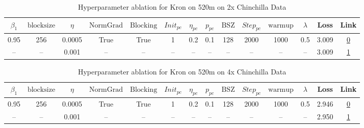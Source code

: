 \begin{table}[H]
\centering
\caption{Hyperparameter ablation for Kron on 520m on 2x Chinchilla Data}
\label{tab:ablation_kron_520m_2}
\begin{tabular}{cccccccccccccc}
\toprule
$\beta_1$ & $\mathrm{block size}$ & $\eta$ & $\mathrm{NormGrad}$ & $\mathrm{Blocking}$ & $Init_{pc}$ & $\eta_{pc}$ & $p_{pc}$ & $\mathrm{BSZ}$ & $Step_{pc}$ & $\mathrm{warmup}$ & $\lambda$ & Loss & Link \\
\midrule
0.95 & 256 & 0.0005 & True & True & 1 & 0.2 & 0.1 & 128 & 2000 & 1000 & 0.5 & 3.009 & \href{https://wandb.ai/stanford-mercury/optimizer-scaling/runs/sweep-520m-21B-krona6b124lr0.0005-wd0.5-b10.95-plr0.2-pis1-gn1-n-6acf07}{0} \\
\midrule
-- & -- & 0.001 & -- & -- & -- & -- & -- & -- & -- & -- & -- & 3.009 & \href{https://wandb.ai/stanford-mercury/optimizer-scaling/runs/sweep-520m-21B-kron680ae4lr0.001-wd0.5-b10.95-plr0.2-pis1-gn1-no-405d3d}{1} \\
\bottomrule
\end{tabular}
\end{table}

\begin{table}[H]
\centering
\caption{Hyperparameter ablation for Kron on 520m on 4x Chinchilla Data}
\label{tab:ablation_kron_520m_4}
\begin{tabular}{cccccccccccccc}
\toprule
$\beta_1$ & $\mathrm{block size}$ & $\eta$ & $\mathrm{NormGrad}$ & $\mathrm{Blocking}$ & $Init_{pc}$ & $\eta_{pc}$ & $p_{pc}$ & $\mathrm{BSZ}$ & $Step_{pc}$ & $\mathrm{warmup}$ & $\lambda$ & Loss & Link \\
\midrule
0.95 & 256 & 0.0005 & True & True & 1 & 0.2 & 0.1 & 128 & 2000 & 1000 & 0.5 & 2.946 & \href{https://wandb.ai/stanford-mercury/optimizer-scaling/runs/sweep-520m-42B-kronf21245lr0.0005-wd0.5-b10.95-plr0.2-pis1-gn1-n-e5e732}{0} \\
\midrule
-- & -- & 0.001 & -- & -- & -- & -- & -- & -- & -- & -- & -- & 2.950 & \href{https://wandb.ai/stanford-mercury/optimizer-scaling/runs/sweep-520m-42B-kron644022lr0.001-wd0.5-b10.95-plr0.2-pis1-gn1-no-bbd127}{1} \\
\bottomrule
\end{tabular}
\end{table}

